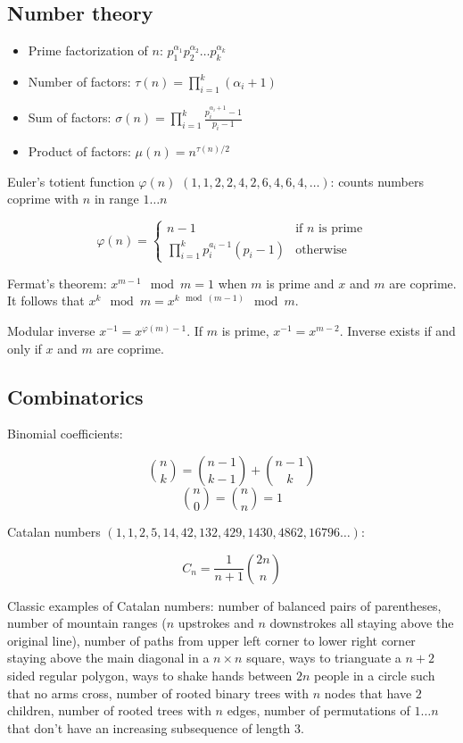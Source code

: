 \documentclass{article}
\begin{document}
\subsection {Number theory}

\begin{itemize}
	\item Prime factorization of $n$: $p_1^{\alpha_1}p_2^{\alpha_2} \dots p_k^{\alpha_k}$
	\item Number of factors: $\tau(n) = \prod_{i=1}^{k} (\alpha_i+1)$
	\item Sum of factors: $\sigma(n) = \prod_{i=1}^{k} \frac{p_i^{\alpha_i+1}-1}{p_i-1}$
	\item Product of factors: $\mu(n) = n^{\tau(n)/2}$
\end{itemize}

Euler's totient function $\varphi(n)$ $(1, 1, 2, 2, 4, 2, 6, 4, 6, 4, \dots)$: counts numbers coprime with $n$ in range $1 \dots n$

\[
	\varphi(n) =
	\begin{cases}
		n-1 &\text{if $n$ is prime} \\
		\prod_{i=1}^{k} p_i^{a_i-1}(p_i-1) &\text{otherwise}
	\end{cases}
\]

Fermat's theorem: $x^{m-1} \mod m = 1$ when $m$ is prime and $x$ and $m$ are coprime. It follows that $x^k \mod m = x^{k \mod (m-1)} \mod m$.

Modular inverse $x^{-1} = x^{\varphi(m)-1}$. If $m$ is prime, $x^{-1} = x^{m-2}$. Inverse exists if and only if $x$ and $m$ are coprime.

\subsection {Combinatorics}

Binomial coefficients:

\[ \binom{n}{k} = \binom{n-1}{k-1} + \binom{n-1}{k} \]
\[ \binom{n}{0} = \binom{n}{n} = 1 \]

Catalan numbers $(1, 1, 2, 5, 14, 42, 132, 429, 1430, 4862, 16796 \dots)$:

\[ C_n = \frac{1}{n+1} \binom{2n}{n} \]

Classic examples of Catalan numbers: number of balanced pairs of parentheses,  number of mountain ranges ($n$ upstrokes and $n$ downstrokes all staying above the original line), number of paths from upper left corner to lower right corner staying above the main diagonal in a $n \times n$ square, ways to trianguate a $n+2$ sided regular polygon, ways to shake hands between $2n$ people in a circle such that no arms cross, number of rooted binary trees with $n$ nodes that have $2$ children, number of rooted trees with $n$ edges, number of permutations of $1 \dots n$ that don't have an increasing subsequence of length $3$.
\end{document}
